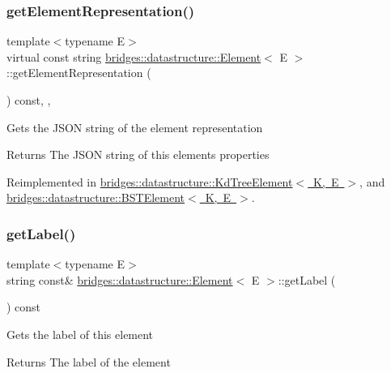 \subsubsection{\texorpdfstring{get\+Element\+Representation()}{getElementRepresentation()}}
{\footnotesize\ttfamily template$<$typename E$>$ \\
virtual const string \mbox{\hyperlink{classbridges_1_1datastructure_1_1_element}{bridges\+::datastructure\+::\+Element}}$<$ E $>$\+::get\+Element\+Representation (\begin{DoxyParamCaption}{ }\end{DoxyParamCaption}) const\hspace{0.3cm}{\ttfamily [inline]}, {\ttfamily [protected]}, {\ttfamily [virtual]}}

Gets the J\+S\+ON string of the element representation \begin{DoxyReturn}{Returns}
The J\+S\+ON string of this element\textquotesingle{}s properties 
\end{DoxyReturn}


Reimplemented in \mbox{\hyperlink{classbridges_1_1datastructure_1_1_kd_tree_element_a5413ecaf152e3df5fb45dd85da812888}{bridges\+::datastructure\+::\+Kd\+Tree\+Element$<$ K, E $>$}}, and \mbox{\hyperlink{classbridges_1_1datastructure_1_1_b_s_t_element_a8f962a01b6e0eff59abeee7768264fd9}{bridges\+::datastructure\+::\+B\+S\+T\+Element$<$ K, E $>$}}.

\mbox{\label{classbridges_1_1datastructure_1_1_element_a44949edf79379a4d48490e98c15992a6}} 
\subsubsection{\texorpdfstring{get\+Label()}{getLabel()}}
{\footnotesize\ttfamily template$<$typename E$>$ \\
string const\& \mbox{\hyperlink{classbridges_1_1datastructure_1_1_element}{bridges\+::datastructure\+::\+Element}}$<$ E $>$\+::get\+Label (\begin{DoxyParamCaption}{ }\end{DoxyParamCaption}) const\hspace{0.3cm}{\ttfamily [inline]}}

Gets the label of this element \begin{DoxyReturn}{Returns}
The label of the element 
\end{DoxyReturn}
\mbox{\label{classbridges_1_1datastructure_1_1_element_a0d43c0aaa96192b49dfc0a499d63a325}} 
